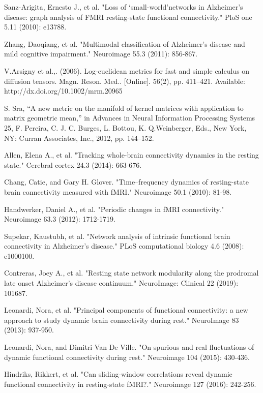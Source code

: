 \documentclass[preprint,12pt]{elsarticle}
\begin{document}
\begin{thebibliography}{1}
		Sanz-Arigita, Ernesto J., et al. "Loss of ‘small-world’networks in Alzheimer's disease: graph analysis of FMRI resting-state functional connectivity." PloS one 5.11 (2010): e13788.
		
		Zhang, Daoqiang, et al. "Multimodal classification of Alzheimer's disease and mild cognitive impairment." Neuroimage 55.3 (2011): 856-867.
		
		V.Arsigny et al.,. (2006). Log-euclidean metrics for fast and simple calculus
		on diffusion tensors. Magn. Reson. Med.. [Online]. 56(2), pp. 411–421.
		Available: http://dx.doi.org/10.1002/mrm.20965
		
		S. Sra, “A new metric on the manifold of kernel matrices with application
		to matrix geometric mean,” in Advances in Neural Information Processing
		Systems 25, F. Pereira, C. J. C. Burges, L. Bottou, K. Q.Weinberger, Eds.,
		New York, NY: Curran Associates, Inc., 2012, pp. 144–152.
		
		Allen, Elena A., et al. "Tracking whole-brain connectivity dynamics in the resting state." Cerebral cortex 24.3 (2014): 663-676.
		
		Chang, Catie, and Gary H. Glover. "Time–frequency dynamics of resting-state brain connectivity measured with fMRI." Neuroimage 50.1 (2010): 81-98.
		
		Handwerker, Daniel A., et al. "Periodic changes in fMRI connectivity." Neuroimage 63.3 (2012): 1712-1719.
		
		Supekar, Kaustubh, et al. "Network analysis of intrinsic functional brain connectivity in Alzheimer's disease." PLoS computational biology 4.6 (2008): e1000100.
		
		Contreras, Joey A., et al. "Resting state network modularity along the prodromal late onset Alzheimer's disease continuum." NeuroImage: Clinical 22 (2019): 101687.
		
		Leonardi, Nora, et al. "Principal components of functional connectivity: a new approach to study dynamic brain connectivity during rest." NeuroImage 83 (2013): 937-950.
		
		Leonardi, Nora, and Dimitri Van De Ville. "On spurious and real fluctuations of dynamic functional connectivity during rest." Neuroimage 104 (2015): 430-436.
		
		Hindriks, Rikkert, et al. "Can sliding-window correlations reveal dynamic functional connectivity in resting-state fMRI?." Neuroimage 127 (2016): 242-256.
		

\end{thebibliography}
\end{document}
